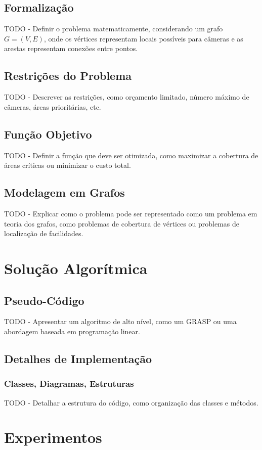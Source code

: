 \documentclass[12pt, a4paper]{report}
\begin{document}
\section{Formalização}
TODO - Definir o problema matematicamente, considerando um grafo \(G = (V, E)\), onde os vértices representam locais possíveis para câmeras e as arestas representam conexões entre pontos.

\section{Restrições do Problema}
TODO - Descrever as restrições, como orçamento limitado, número máximo de câmeras, áreas prioritárias, etc.

\section{Função Objetivo}
TODO - Definir a função que deve ser otimizada, como maximizar a cobertura de áreas críticas ou minimizar o custo total.

\section{Modelagem em Grafos}
TODO - Explicar como o problema pode ser representado como um problema em teoria dos grafos, como problemas de cobertura de vértices ou problemas de localização de facilidades.

\chapter{Solução Algorítmica}

\section{Pseudo-Código}
TODO - Apresentar um algoritmo de alto nível, como um GRASP ou uma abordagem baseada em programação linear.

\section{Detalhes de Implementação}
\subsection{Classes, Diagramas, Estruturas}
TODO - Detalhar a estrutura do código, como organização das classes e métodos.

\chapter{Experimentos}
\end{document}
